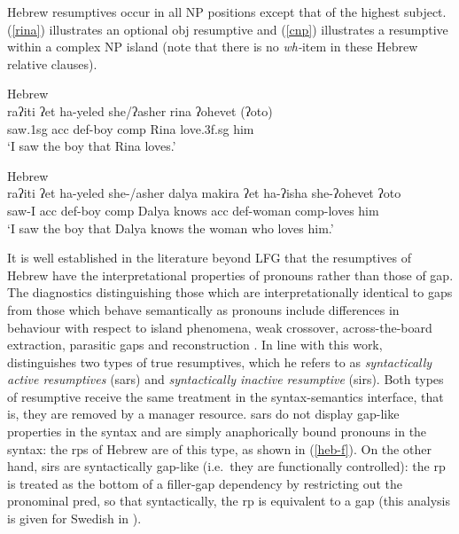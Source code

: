 \documentclass[output=paper,hidelinks]{langscibook}
\begin{document}
Hebrew resumptives occur in all NP positions except that of the highest subject.  (\ref{rina}) illustrates an optional {\sc obj} resumptive and (\ref{cnp}) illustrates a resumptive within a complex NP island (note that there is no {\em wh-}item in these Hebrew relative clauses).



\ea
\label{rina} Hebrew \citep[220]{Borer:84}\\
\gll ra{ʔ}iti {ʔ}et ha-yeled she/{ʔ}asher rina {ʔ}ohevet ({ʔ}oto)\\
saw.{\sc 1sg} {\sc acc} {\sc def}-boy {\sc comp} Rina love.{\sc 3f.sg} him\\
\glt `I saw the boy that Rina loves.'
\z


\ea  \label{cnp} Hebrew \citep[221]{Borer:84} \\
\gll ra{ʔ}iti {ʔ}et ha-yeled she-/asher dalya makira {ʔ}et ha-{ʔ}isha she-{ʔ}ohevet {ʔ}oto\\
saw-I {\sc acc} {\sc def}-boy {\sc comp} Dalya knows {\sc acc} {\sc def}-woman {\sc comp}-loves him \\
\glt `I saw the boy that Dalya knows the woman who loves him.'
  \z




 It is well established in the literature beyond LFG  that the resumptives of Hebrew have the interpretational properties of pronouns rather than those of gap.
The diagnostics distinguishing those  which are interpretationally identical to gaps from those which behave semantically as pronouns
include differences in behaviour with respect to island phenomena, weak crossover, across-the-board extraction, parasitic gaps and reconstruction \citep[106]{McCloskey:2006}.  In line with this work,  \citet{Asudeh10,Asudeh12} distinguishes two
types of true resumptives, which he refers to as {\em syntactically active resumptives} ({\sc sar}s)  and {\em
  syntactically inactive resumptive} ({\sc sir}s). Both types of
resumptive receive the same treatment in the syntax-semantics
interface, that is, they are removed by a manager resource. {\sc sar}s  do not
display gap-like properties in the syntax and  are simply anaphorically bound
pronouns in the syntax: the {\sc rp}s of Hebrew are of this type, as shown in (\ref{heb-f}).
On the other hand,  {\sc sir}s are
syntactically gap-like (i.e.\ they are  functionally controlled): the {\sc rp} is treated as  the bottom
of a filler-gap dependency by restricting out the pronominal  {\sc pred}, so that syntactically, the {\sc rp} is equivalent to a gap (this analysis is given for Swedish in \citealt{Asudeh12}).
\end{document}
